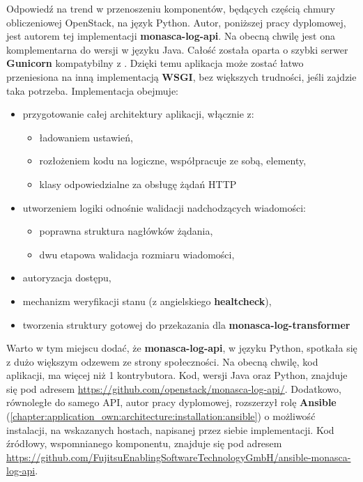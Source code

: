Odpowiedź na trend w przenoszeniu komponentów, będących częścią chmury obliczeniowej OpenStack, na język Python. Autor, poniższej pracy dyplomowej, jest autorem tej implementacji \textbf{monasca-log-api}. Na obecną chwilę jest ona komplementarna do wersji w języku Java. Całość została oparta o szybki serwer \textbf{Gunicorn} kompatybilny z . Dzięki
temu aplikacja może zostać łatwo przeniesiona na inną implementacją \textbf{WSGI}, bez większych trudności,
jeśli zajdzie taka potrzeba. Implementacja obejmuje:
\begin{itemize}
    \item przygotowanie całej architektury aplikacji, włącznie z:
    \begin{itemize}
        \item ładowaniem ustawień,
        \item rozłożeniem kodu na logiczne, współpracuje ze sobą, elementy,
        \item klasy odpowiedzialne za obsługę żądań HTTP
    \end{itemize}
    \item utworzeniem logiki odnośnie walidacji nadchodzących wiadomości:
    \begin{itemize}
        \item poprawna struktura nagłówków żądania,
        \item dwu etapowa walidacja rozmiaru wiadomości,
    \end{itemize}
    \item autoryzacja dostępu,
    \item mechanizm weryfikacji stanu (z angielskiego \textbf{healtcheck}),
    \item tworzenia struktury gotowej do przekazania dla \textbf{monasca-log-transformer}
\end{itemize}

Warto w tym miejscu dodać, że \textbf{monasca-log-api}, w języku Python, spotkała się z dużo
większym odzewem ze strony społeczności. Na obecną chwilę, kod aplikacji, ma więcej niż 1 kontrybutora.
Kod, wersji Java oraz Python, znajduje się pod adresem \url{https://github.com/openstack/monasca-log-api/}.
Dodatkowo, równoległe do samego API, autor pracy dyplomowej, rozszerzył rolę \textbf{Ansible} (\ref{chapter:application_own:architecture:installation:ansible}) o
możliwość instalacji, na wskazanych hostach, napisanej przez siebie implementacji. Kod źródłowy, wspomnianego komponentu, znajduje się
pod adresem \url{https://github.com/FujitsuEnablingSoftwareTechnologyGmbH/ansible-monasca-log-api}.

